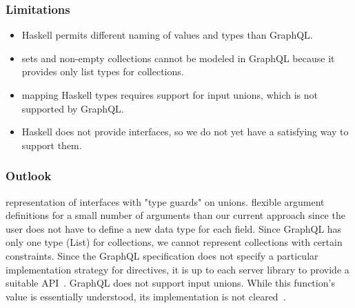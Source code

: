 \begin{frame}\frametitle{Limitations}

\begin{itemize}
    \item Haskell permits different naming of values and types than GraphQL. 
    \item sets and non-empty collections cannot be modeled in GraphQL because it provides only list types for collections. 
    \item mapping Haskell types requires support for input unions, which is not supported by GraphQL. 
    \item Haskell does not provide interfaces, so we do not yet have a satisfying way to support them. 
\end{itemize}

\end{frame}

\begin{frame}\frametitle{Outlook}

\begin{itemize}
     representation of interfaces with "type guards" on unions. 
     flexible argument definitions for a small number of arguments than our current approach since the user does not have to define a new data type for each field. 
     Since GraphQL has only one type (List) for collections, we cannot represent collections with certain constraints. 
    Since the GraphQL specification does not specify a particular implementation strategy for directives, it is up to each server library to provide a suitable API~\cite{schema-directives}.
     GraphQL does not support input unions. While this function's value is essentially understood, its implementation is not cleared~\cite{gql-spec-input-unions}. 

\end{itemize}

\end{frame}